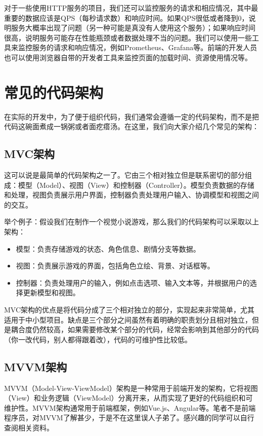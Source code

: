 对于一些使用HTTP服务的项目，我们还可以监控服务的请求和相应情况，其中最重要的数据应该是QPS（每秒请求数）和响应时间。如果QPS很低或者降到0，说明服务大概率出现了问题（另一种可能是真没有人使用这个服务）；如果响应时间很高，说明服务可能存在性能瓶颈或者数据处理不当的问题。我们可以使用一些工具来监控服务的请求和响应情况，例如Prometheus、Grafana等。前端的开发人员也可以使用浏览器自带的开发者工具来监控页面的加载时间、资源使用情况等。

\section{常见的代码架构}\label{sec:code-architecture}

在实际的开发中，为了便于组织代码，我们通常会遵循一定的代码架构，而不是把代码这碗面煮成一锅粥或者面疙瘩汤。在这里，我们向大家介绍几个常见的架构：

\subsection{MVC架构}

这可以说是最简单的代码架构之一了。它由三个相对独立但是联系密切的部分组成：模型（Model）、视图（View）和控制器（Controller）。模型负责数据的存储和处理，视图负责展示用户界面，控制器负责处理用户输入、协调模型和视图之间的交互。

举个例子：假设我们在制作一个视觉小说游戏，那么我们的代码架构可以采取以上架构：
\begin{itemize}
  \item 模型：负责存储游戏的状态、角色信息、剧情分支等数据。
  \item 视图：负责展示游戏的界面，包括角色立绘、背景、对话框等。
  \item 控制器：负责处理用户的输入，例如点击选项、输入文本等，并根据用户的选择更新模型和视图。
\end{itemize}

MVC架构的优点是将代码分成了三个相对独立的部分，实现起来非常简单，尤其适用于中小型项目。缺点是三个部分之间虽然有着明确的职责划分且相对独立，但是耦合度仍然较高，如果需要修改某个部分的代码，经常会影响到其他部分的代码（你一改代码，别人都得跟着改），代码的可维护性比较低。

\subsection{MVVM架构}
MVVM（Model-View-ViewModel）架构是一种常用于前端开发的架构，它将视图（View）和业务逻辑（ViewModel）分离开来，从而实现了更好的代码组织和可维护性。MVVM架构通常用于前端框架，例如Vue.js、Angular等。笔者不是前端程序员，对MVVM了解甚少，于是不在这里误人子弟了。感兴趣的同学可以自行查阅相关资料。

